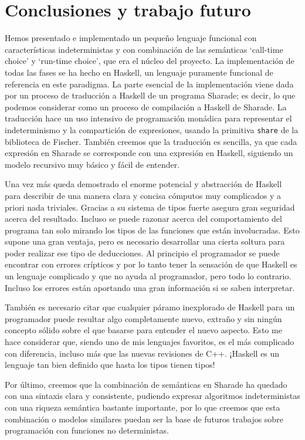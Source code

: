 \documentclass[class=article, crop=false]{standalone}
\begin{document}
\section{Conclusiones y trabajo futuro}
Hemos presentado e implementado un pequeño lenguaje funcional con características
indeterministas y con combinación de las semánticas `call-time choice' y `run-time choice',
que era el núcleo del proyecto. La implementación de todas las fases se ha hecho en Haskell,
un lenguaje puramente funcional de referencia en este paradigma. La parte esencial de la
implementación viene dada por un proceso de traducción a Haskell de un programa Sharade; es
decir, lo que podemos considerar como un proceso de compilación a Haskell de Sharade. La
traducción hace un uso intensivo de programación monádica para representar el indeterminismo
y la compartición de expresiones, usando la primitiva \verb`share` de la biblioteca de
Fischer. También creemos que la traducción es sencilla, ya que cada expresión en Sharade se
corresponde con una expresión en Haskell, siguiendo un modelo recursivo muy básico y fácil de
entender.

Una vez más queda demostrado el enorme potencial y abstracción de Haskell para describir de
una manera clara y concisa cómputos muy complicados y a priori nada triviales. Gracias a su
sistema de tipos fuerte asegura gran seguridad acerca del resultado. Incluso se puede razonar
acerca del comportamiento del programa tan solo mirando los tipos de las funciones que están
involucradas. Esto supone una gran ventaja, pero es necesario desarrollar una cierta soltura
para poder realizar ese tipo de deducciones. Al principio el programador se puede encontrar
con errores crípticos y por lo tanto tener la sensación de que Haskell es un lenguaje
complicado y que no ayuda al programador, pero todo lo contrario. Incluso los errores están
aportando una gran información si se saben interpretar.

También es necesario citar que cualquier páramo inexplorado de Haskell para un programador
puede resultar algo completamente nuevo, extraño y sin ningún concepto sólido sobre el que
basarse para entender el nuevo aspecto. Esto me hace considerar que, siendo uno de mis
lenguajes favoritos, es el más complicado con diferencia, incluso más que las nuevas
revisiones de C++. ¡Haskell es un lenguaje tan bien definido que hasta los tipos tienen
tipos!

Por último, creemos que la combinación de semánticas en Sharade ha quedado con una sintaxis
clara y consistente, pudiendo expresar algoritmos indeterministas con una riqueza semántica
bastante importante, por lo que creemos que esta combinación o modelos similares puedan ser
la base de futuros trabajos sobre programación con funciones no deterministas.
\end{document}
